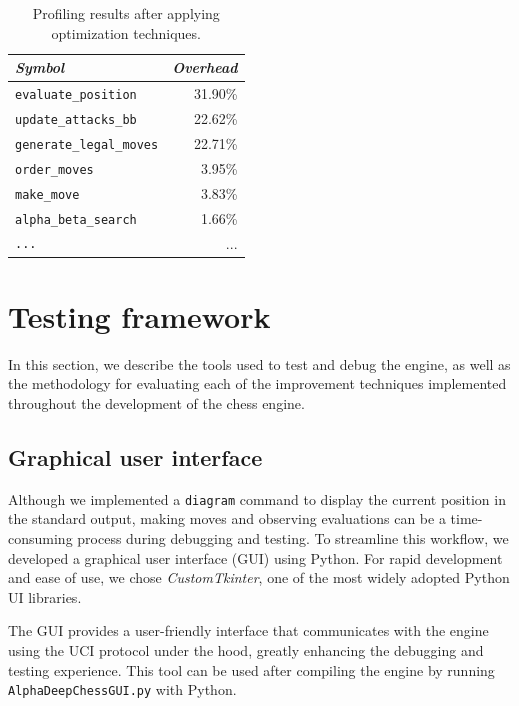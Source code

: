 \begin{table}[H]
    \centering
    \begin{tabular}{|l|r|}
    \hline
    \textit{Symbol} & \textit{Overhead} \\
    \hline
    \texttt{evaluate\_position}       &  31.90\% \\
    \texttt{update\_attacks\_bb}    &  22.62\% \\
    \texttt{generate\_legal\_moves}          &  22.71\% \\
    \texttt{order\_moves}      &   3.95\% \\
    \texttt{make\_move}       &   3.83\% \\
    \texttt{alpha\_beta\_search}          &   1.66\% \\
    \texttt{...}                          &   ...     \\
    \hline
    \end{tabular}
    \caption{Profiling results after applying optimization techniques.}
    \label{tab:profilingImprovements}
\end{table}

\section{Testing framework}

\noindent In this section, we describe the tools used to test and debug the engine, as well as the methodology for evaluating each of the improvement techniques implemented throughout the development of the chess engine.

\subsection*{Graphical user interface}

\noindent Although we implemented a \texttt{diagram} command to display the current position in the standard output, making moves and observing evaluations can be a time-consuming process during debugging and testing. To streamline this workflow, we developed a graphical user interface (GUI) using Python. For rapid development and ease of use, we chose \textit{CustomTkinter}, one of the most widely adopted Python UI libraries.

\vspace{1em}

\parbox{\textwidth}{\noindent The GUI provides a user-friendly interface that communicates with the engine using the UCI protocol under the hood, greatly enhancing the debugging and testing experience. This tool can be used after compiling the engine by running \texttt{AlphaDeepChessGUI.py} with Python.}


